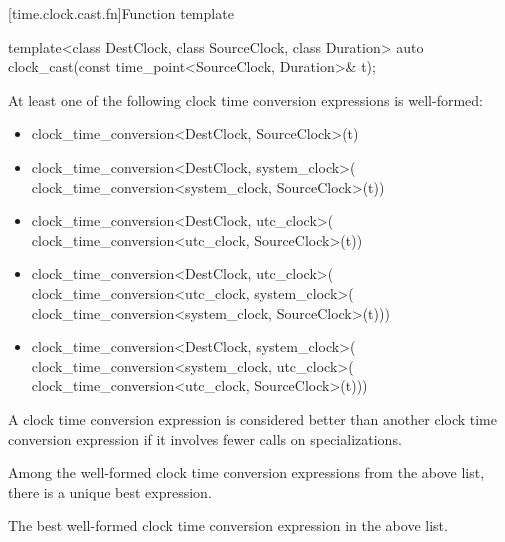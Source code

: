 [time.clock.cast.fn]{Function template }

%
\begin{itemdecl}
template<class DestClock, class SourceClock, class Duration>
  auto clock_cast(const time_point<SourceClock, Duration>& t);
\end{itemdecl}

\begin{itemdescr}
\pnum
\constraints
At least one of the following clock time conversion expressions
is well-formed:

\begin{itemize}
\item
\begin{codeblock}
clock_time_conversion<DestClock, SourceClock>{}(t)
\end{codeblock}

\item
\begin{codeblock}
clock_time_conversion<DestClock, system_clock>{}(
  clock_time_conversion<system_clock, SourceClock>{}(t))
\end{codeblock}

\item
\begin{codeblock}
clock_time_conversion<DestClock, utc_clock>{}(
  clock_time_conversion<utc_clock, SourceClock>{}(t))
\end{codeblock}

\item
\begin{codeblock}
clock_time_conversion<DestClock, utc_clock>{}(
  clock_time_conversion<utc_clock, system_clock>{}(
    clock_time_conversion<system_clock, SourceClock>{}(t)))
\end{codeblock}

\item
\begin{codeblock}
clock_time_conversion<DestClock, system_clock>{}(
  clock_time_conversion<system_clock, utc_clock>{}(
    clock_time_conversion<utc_clock, SourceClock>{}(t)))
\end{codeblock}
\end{itemize}

A clock time conversion expression is considered better than
another clock time conversion expression if it involves fewer
 calls on 
specializations.

\pnum
\mandates
Among the well-formed clock time conversion expressions
from the above list, there is a unique best expression.

\pnum
\returns
The best well-formed clock time conversion expression in the above list.
\end{itemdescr}

